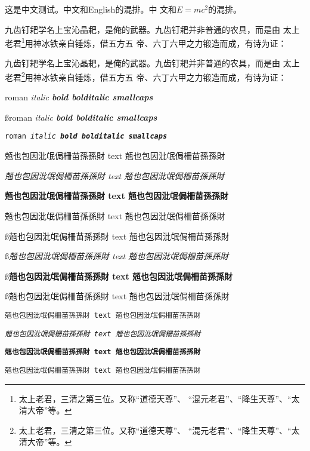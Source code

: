 \usemodule[zhspacing]


这是中文测试。中文和English的混排。中
文和$E=mc^2$的混排。

九齿钉耙学名上宝沁晶耙，是俺的武器。九齿钉耙并非普通的农具，而是由
太上老君\footnote{太上老君，三清之第三位。又称“道德天尊”、
“混元老君”、“降生天尊”、“太清大帝”等。}用神冰铁亲自锤炼，借五方五
帝、六丁六甲之力锻造而成，有诗为证：

九齿钉耙学名上宝沁晶耙，是俺的武器。九齿钉耙并非普通的农具，而是由
太上老君\footnote{太上老君，三清之第三位。又称“道德天尊”、
“混元老君”、“降生天尊”、“太清大帝”等。}用神冰铁亲自锤炼，借五方五
帝、六丁六甲之力锻造而成，有诗为证：

\rm\tf roman \it italic \bf bold \bi bolditalic \sc smallcaps

\ss\tf roman \it italic \bf bold \bi bolditalic \sc smallcaps

\tt\tf roman \it italic \bf bold \bi bolditalic \sc smallcaps

\blank

\rm\tf 兡也包因沘氓侷柵苗孫孫財 text 兡也包因沘氓侷柵苗孫孫財\par
\rm\it 兡也包因沘氓侷柵苗孫孫財 text 兡也包因沘氓侷柵苗孫孫財\par 
\rm\bf 兡也包因沘氓侷柵苗孫孫財 text 兡也包因沘氓侷柵苗孫孫財\par 
\rm\bi 兡也包因沘氓侷柵苗孫孫財 text 兡也包因沘氓侷柵苗孫孫財\par 

\blank

\ss\tf 兡也包因沘氓侷柵苗孫孫財 text 兡也包因沘氓侷柵苗孫孫財\par
\ss\it 兡也包因沘氓侷柵苗孫孫財 text 兡也包因沘氓侷柵苗孫孫財\par
\ss\bf 兡也包因沘氓侷柵苗孫孫財 text 兡也包因沘氓侷柵苗孫孫財\par
\ss\bi 兡也包因沘氓侷柵苗孫孫財 text 兡也包因沘氓侷柵苗孫孫財\par

\blank

\tt\tf 兡也包因沘氓侷柵苗孫孫財 text 兡也包因沘氓侷柵苗孫孫財\par
\tt\it 兡也包因沘氓侷柵苗孫孫財 text 兡也包因沘氓侷柵苗孫孫財\par
\tt\bf 兡也包因沘氓侷柵苗孫孫財 text 兡也包因沘氓侷柵苗孫孫財\par
\tt\bi 兡也包因沘氓侷柵苗孫孫財 text 兡也包因沘氓侷柵苗孫孫財\par


\bye